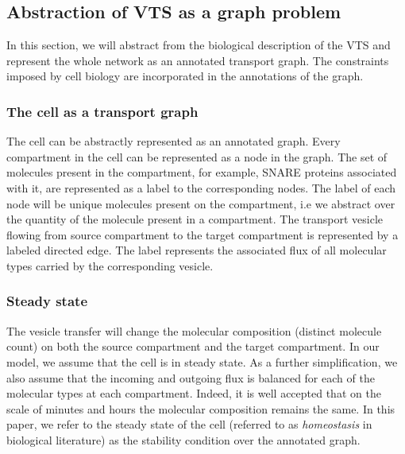 \subsection{Abstraction of VTS as a graph problem}


\noindent In this section, we will abstract from the biological description of the VTS and represent the whole network as an annotated transport graph. 
%
The constraints imposed by cell biology are incorporated in the  annotations of the graph. 

\subsubsection{The cell as a transport graph} 
The cell can be abstractly represented as an annotated graph. 
Every compartment in the cell can be represented as a node in the graph. 
%
The set of molecules present in the compartment, for example, SNARE proteins associated with it, are represented as a label to the corresponding nodes.
%
The label of each node will be unique molecules present on the compartment, i.e we abstract over the quantity of the molecule present in a compartment.
%
The transport vesicle flowing from source compartment to the target compartment is represented by a labeled directed edge. 
% 
The label represents the associated flux of all molecular types carried by the corresponding vesicle.
%
%

\subsubsection{Steady state} 
The vesicle transfer will change the molecular composition (distinct molecule count) on both the source compartment and the target compartment. 
%
In our model, we assume that the cell is in steady state. As a further simplification, we also assume that the incoming and outgoing flux is balanced for each of the molecular types at each compartment. 
Indeed, it is well accepted that on the scale of minutes and hours the molecular composition remains the same. 
%
In this paper, we refer to the steady state of the cell (referred to as \textit{homeostasis} in biological literature) as the stability condition over the annotated graph.


